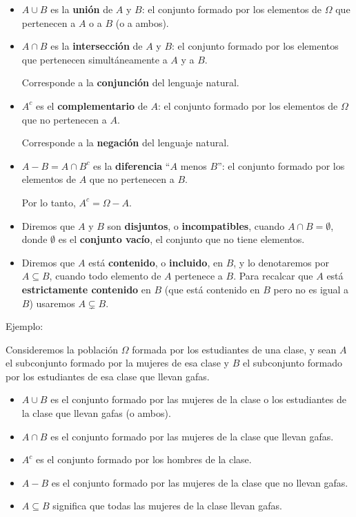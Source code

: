 \documentclass[
  spanish,
  letterpaper,
  DIV=11,
  numbers=noendperiod]{scrreprt}
\begin{document}
\begin{tcolorbox}
\begin{itemize}
\item
  \(A\cup B\) es la \textbf{unión} de \(A\) y \(B\): el conjunto formado
  por los elementos de \(\Omega\) que pertenecen a \(A\) o a \(B\) (o a
  ambos).
\item
  \(A \cap B\) es la \textbf{intersección} de \(A\) y \(B\): el conjunto
  formado por los elementos que pertenecen simultáneamente a \(A\) y a
  \(B\).

  Corresponde a la \textbf{conjunción} del lenguaje natural.
\item
  \(A^c\) es el \textbf{complementario} de \(A\): el conjunto formado
  por los elementos de \(\Omega\) que no pertenecen a \(A\).

  Corresponde a la \textbf{negación} del lenguaje natural.
\item
  \(A-B=A \cap B^c\) es la \textbf{diferencia} ``\(A\) menos \(B\)'': el
  conjunto formado por los elementos de \(A\) que no pertenecen a \(B\).

  Por lo tanto, \(A^c=\Omega-A\).
\item
  Diremos que \(A\) y \(B\) son \textbf{disjuntos}, o
  \textbf{incompatibles}, cuando \(A\cap B=\emptyset\), donde
  \(\emptyset\) es el \textbf{conjunto vacío}, el conjunto que no tiene
  elementos.
\item
  Diremos que \(A\) está \textbf{contenido}, o \textbf{incluido}, en
  \(B\), y lo denotaremos por \(A\subseteq B\), cuando todo elemento de
  \(A\) pertenece a \(B\). Para recalcar que \(A\) está
  \textbf{estrictamente contenido} en \(B\) (que está contenido en \(B\)
  pero no es igual a \(B\)) usaremos \(A\subsetneq B\).
\end{itemize}

Ejemplo:

Consideremos la población \(\Omega\) formada por los estudiantes de una
clase, y sean \(A\) el subconjunto formado por la mujeres de esa clase y
\(B\) el subconjunto formado por los estudiantes de esa clase que llevan
gafas.

\begin{itemize}
\item
  \(A\cup B\) es el conjunto formado por las mujeres de la clase o los
  estudiantes de la clase que llevan gafas (o ambos).
\item
  \(A \cap B\) es el conjunto formado por las mujeres de la clase que
  llevan gafas.
\item
  \(A^c\) es el conjunto formado por los hombres de la clase.
\item
  \(A-B\) es el conjunto formado por las mujeres de la clase que no
  llevan gafas.
\item
  \(A\subseteq B\) significa que todas las mujeres de la clase llevan
  gafas.
\end{itemize}


\end{tcolorbox}
\end{document}
